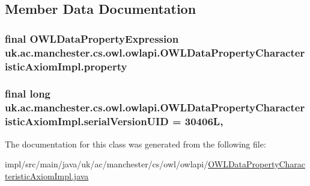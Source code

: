 \subsection{Member Data Documentation}
\hypertarget{classuk_1_1ac_1_1manchester_1_1cs_1_1owl_1_1owlapi_1_1_o_w_l_data_property_characteristic_axiom_impl_aef4c9490bb2baa33cc38110d4d03140a}{
\subsubsection[{property}]{\setlength{\rightskip}{0pt plus 5cm}final {\bf O\-W\-L\-Data\-Property\-Expression} uk.\-ac.\-manchester.\-cs.\-owl.\-owlapi.\-O\-W\-L\-Data\-Property\-Characteristic\-Axiom\-Impl.\-property\hspace{0.3cm}{\ttfamily [private]}}}\label{classuk_1_1ac_1_1manchester_1_1cs_1_1owl_1_1owlapi_1_1_o_w_l_data_property_characteristic_axiom_impl_aef4c9490bb2baa33cc38110d4d03140a}
\hypertarget{classuk_1_1ac_1_1manchester_1_1cs_1_1owl_1_1owlapi_1_1_o_w_l_data_property_characteristic_axiom_impl_aedac673e7dfdd7c081fbb393e28dfbd6}{
\subsubsection[{serial\-Version\-U\-I\-D}]{\setlength{\rightskip}{0pt plus 5cm}final long uk.\-ac.\-manchester.\-cs.\-owl.\-owlapi.\-O\-W\-L\-Data\-Property\-Characteristic\-Axiom\-Impl.\-serial\-Version\-U\-I\-D = 30406\-L\hspace{0.3cm}{\ttfamily [static]}, {\ttfamily [private]}}}\label{classuk_1_1ac_1_1manchester_1_1cs_1_1owl_1_1owlapi_1_1_o_w_l_data_property_characteristic_axiom_impl_aedac673e7dfdd7c081fbb393e28dfbd6}


The documentation for this class was generated from the following file\-:\begin{DoxyCompactItemize}
\item 
impl/src/main/java/uk/ac/manchester/cs/owl/owlapi/\hyperlink{_o_w_l_data_property_characteristic_axiom_impl_8java}{O\-W\-L\-Data\-Property\-Characteristic\-Axiom\-Impl.\-java}\end{DoxyCompactItemize}

